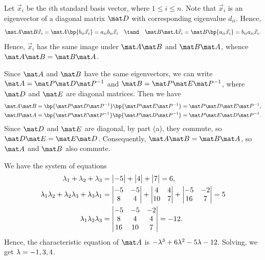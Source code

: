 \begin{solution}
    \begin{ppart}
        Let $\vec x_i$ be the $i$th standard basis vector, where $1 \leq i \leq n$. Note that $\vec x_i$ is an eigenvector of a diagonal matrix $\mat D$ with corresponding eigenvalue $d_{ii}$. Hence, \[\mat A \mat B \vec x_i = \mat A \bp{b_{ii} \vec x_i} = a_{ii} b_{ii} \vec x_i \quad \tand \quad \mat B \mat A \vec x_i = \mat B \bp{a_{ii} \vec x_i} = b_{ii} a_{ii} \vec x_i.\] Hence, $\vec x_i$ has the same image under $\mat A \mat B$ and $\mat B \mat A$, whence $\mat A \mat B = \mat B \mat A$.
    \end{ppart}
    \begin{ppart}
        Since $\mat A$ and $\mat B$ have the same eigenvectors, we can write $\mat A = \mat P \mat D \mat P^{-1}$ and $\mat B = \mat P \mat E \mat P^{-1}$, where $\mat D$ and $\mat E$ are diagonal matrices. Then we have
        \begin{align*}
            \mat A \mat B &= \bp{\mat P \mat D \mat P^{-1}}\bp{\mat P \mat E \mat P^{-1}} = \mat P \mat D \mat E \mat P^{-1},\\
            \mat B \mat A &= \bp{\mat P \mat E \mat P^{-1}}\bp{\mat P \mat D \mat P^{-1}} = \mat P \mat E \mat D \mat P^{-1}.
        \end{align*}
        Since $\mat D$ and $\mat E$ are diagonal, by part (a), they commute, so $\mat D \mat E = \mat E \mat D$. Consequently, $\mat A \mat B = \mat B \mat A$, so $\mat A$ and $\mat B$ also commute.
    \end{ppart}
    \begin{ppart}
        We have the system of equations
        \begin{align*}
            \lambda_1 + \lambda_2 + \lambda_3 &= \begin{vmatrix}-5\end{vmatrix} + \begin{vmatrix}4\end{vmatrix} + \begin{vmatrix}7\end{vmatrix} = 6,\\
            \lambda_1 \lambda_2 + \lambda_2 \lambda_3 + \lambda_3 \lambda_1 &= \begin{vmatrix}-5 & -5 \\ 8 & 4\end{vmatrix} + \begin{vmatrix}4 & 4 \\ 10 & 7\end{vmatrix} + \begin{vmatrix}-5 & -2 \\ 16 & 7\end{vmatrix} = 5 \\
            \lambda_1 \lambda_2 \lambda_3 &= \begin{vmatrix}-5 & -5 & -2 \\ 8 & 4 & 4 \\ 16 & 10 & 7\end{vmatrix} = -12.
        \end{align*}
        Hence, the characteristic equation of $\mat A$ is $-\lambda^3 + 6\lambda^2 - 5 \lambda - 12$. Solving, we get $\lambda = -1, 3, 4$.


\end{ppart}
\end{solution}
